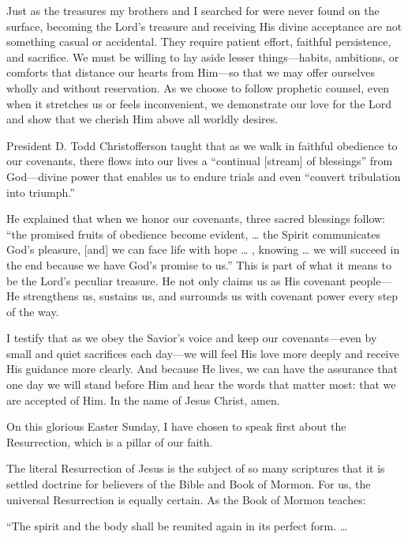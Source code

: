 \documentclass[letterpaper, 11pt]{report}
\newcommand{\speaker}{}
\newcommand{\talk}{}
\newcommand{\talkdatestr}{}
\newcommand{\setspeaker}[1]{\renewcommand{\speaker}{#1}}
\newcommand{\settalk}[1]{\renewcommand{\talk}{#1}}
\newcommand{\talkheading}[2]{%
    \vspace{1em}
    \noindent{\huge\bfseries #1}
    \par\nopagebreak\vspace{0.25em}
    \noindent{\normalsize\bfseries #2\ifx\talkdatestr\empty\else,\ \talkdatestr\fi}
    \par\nopagebreak\vspace{0.5em}
}
\newcommand{\intalkheader}[1]{
    \vspace{0.75em}
    \noindent{\normalsize\bfseries #1}
    \par\nopagebreak %
    \vspace{0.25em}
    \nopagebreak     %
}
\begin{document}
Just as the treasures my brothers and I searched for were never found on the surface, becoming the Lord’s treasure and receiving His divine acceptance are not something casual or accidental. They require patient effort, faithful persistence, and sacrifice. We must be willing to lay aside lesser things—habits, ambitions, or comforts that distance our hearts from Him—so that we may offer ourselves wholly and without reservation. As we choose to follow prophetic counsel, even when it stretches us or feels inconvenient, we demonstrate our love for the Lord and show that we cherish Him above all worldly desires.

President D. Todd Christofferson taught that as we walk in faithful obedience to our covenants, there flows into our lives a “continual [stream] of blessings” from God—divine power that enables us to endure trials and even “convert tribulation into triumph.”

He explained that when we honor our covenants, three sacred blessings follow: “the promised fruits of obedience become evident, … the Spirit communicates God’s pleasure, [and] we can face life with hope … , knowing … we will succeed in the end because we have God’s promise to us.” This is part of what it means to be the Lord’s peculiar treasure. He not only claims us as His covenant people—He strengthens us, sustains us, and surrounds us with covenant power every step of the way.

I testify that as we obey the Savior’s voice and keep our covenants—even by small and quiet sacrifices each day—we will feel His love more deeply and receive His guidance more clearly. And because He lives, we can have the assurance that one day we will stand before Him and hear the words that matter most: that we are accepted of Him. In the name of Jesus Christ, amen.

\newpage
\settalk{Alive in Christ}
\setspeaker{Dallin H. Oaks}
\talkheading{Alive in Christ}{Dallin H. Oaks}

\intalkheader{I.}

On this glorious Easter Sunday, I have chosen to speak first about the Resurrection, which is a pillar of our faith.

The literal Resurrection of Jesus is the subject of so many scriptures that it is settled doctrine for believers of the Bible and Book of Mormon. For us, the universal Resurrection is equally certain. As the Book of Mormon teaches:

“The spirit and the body shall be reunited again in its perfect form. …
\end{document}
